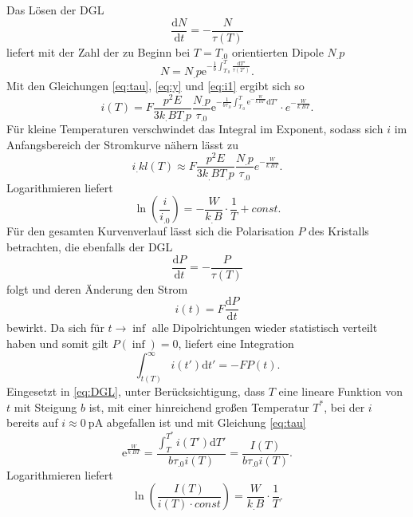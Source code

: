Das Lösen der DGL
\[
\frac{\mathrm{d}N}{\mathrm{d}t}=-\frac{N}{\tau(T)}
\]
liefert mit der Zahl der zu Beginn bei $T=T_.0$ orientierten Dipole $N_.p$
\begin{equation}
N=N_.p\mathrm{e}^{-\frac{1}{b}\int_{T_.0}^T\frac{\mathrm{d}T'}{\tau(T')}}\text{.}\label{eq:N}
\end{equation}
Mit den Gleichungen \eqref{eq:tau}, \eqref{eq:y} und \eqref{eq:i1} ergibt sich so
\begin{equation}
i(T)=F\frac{p^2E}{3k_.BT_.p}\frac{N_.p}{\tau_.0}\mathrm{e}^{-\frac{1}{b\tau_.0}\int_{T_.0}^T\mathrm{e}^{-\frac{W}{k_.BT'}}\mathrm{d}T'}\cdot e^{-\frac{W}{k_.BT}}\text{.}\label{eq:i2}
\end{equation}
Für kleine Temperaturen verschwindet das Integral im Exponent, sodass sich $i$ im Anfangsbereich der Stromkurve nähern lässt zu
\begin{equation}
i_.{kl}(T)\approx F\frac{p^2E}{3k_.BT_.p}\frac{N_.p}{\tau_.0}e^{-\frac{W}{k_.BT}}\text{.}\label{eq:i_kl}
\end{equation}
Logarithmieren liefert 
\begin{equation}
\ln\left(\frac{i}{i_.0}\right)=-\frac{W}{k_.B}\cdot\frac{1}{T}+const\text{.}\label{eq:ln1}
\end{equation}
Für den gesamten Kurvenverlauf lässt sich die Polarisation $P$ des Kristalls betrachten, die ebenfalls der DGL
\begin{equation}
\frac{\mathrm{d}P}{\mathrm{d}t}=-\frac{P}{\tau(T)}\label{eq:DGL}
\end{equation}
folgt und deren Änderung den Strom
\[
i(t)=F\frac{\mathrm{d}P}{\mathrm{d}t}
\]
bewirkt. Da sich für $t\rightarrow\inf$ alle Dipolrichtungen wieder statistisch verteilt haben und somit gilt $P(\inf)=0$, liefert eine Integration
\[
\int_{t(T)}^{\infty}i(t')\mathrm{d}t'=-F P(t)\text{.}
\]
Eingesetzt in \eqref{eq:DGL}, unter Berücksichtigung, dass $T$ eine lineare Funktion von $t$ mit Steigung $b$ ist, mit einer hinreichend großen Temperatur $T^*$, bei der $i$ bereits auf $i\approx\SI{0}{\pico\ampere}$ abgefallen ist und mit Gleichung \eqref{eq:tau}
\begin{equation}
\mathrm{e}^{\frac{W}{k_.BT}}=\frac{\int_{T}^{T^*}i(T')\mathrm{d}T'}{b\tau_.0 i(T)}=\frac{I(T)}{b\tau_.0 i(T)}\text{.}\label{eq:i3}
\end{equation}
Logarithmieren liefert
\begin{equation}
\ln\left(\frac{I(T)}{i(T)\cdot const}\right)=\frac{W}{k_.B}\cdot\frac{1}{T}\text{.}\label{eq:ln2}
\end{equation}
